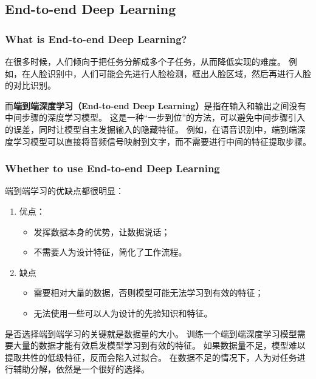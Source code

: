 \subsection{End-to-end Deep Learning}

\subsubsection{What is End-to-end Deep Learning?}

在很多时候，人们倾向于把任务分解成多个子任务，从而降低实现的难度。
例如，在人脸识别中，人们可能会先进行人脸检测，框出人脸区域，然后再进行人脸的对比识别。

而\textbf{端到端深度学习（End-to-end Deep Learning）}是指在输入和输出之间没有中间步骤的深度学习模型。
这是一种“一步到位”的方法，可以避免中间步骤引入的误差，同时让模型自主发掘输入的隐藏特征。
例如，在语音识别中，端到端深度学习模型可以直接将音频信号映射到文字，而不需要进行中间的特征提取步骤。

\subsubsection{Whether to use End-to-end Deep Learning}

端到端学习的优缺点都很明显：

\begin{enumerate}
    \item 优点：
        \begin{itemize}
            \item 发挥数据本身的优势，让数据说话；
            \item 不需要人为设计特征，简化了工作流程。
        \end{itemize}
    \item 缺点
        \begin{itemize}
            \item 需要相对大量的数据，否则模型可能无法学习到有效的特征；
            \item 无法使用一些可以人为设计的先验知识和特征。
        \end{itemize}
\end{enumerate}

是否选择端到端学习的关键就是数据量的大小。
训练一个端到端深度学习模型需要大量的数据才能有效启发模型学习到有效的特征。
如果数据量不足，模型难以提取共性的低级特征，反而会陷入过拟合。
在数据不足的情况下，人为对任务进行辅助分解，依然是一个很好的选择。
